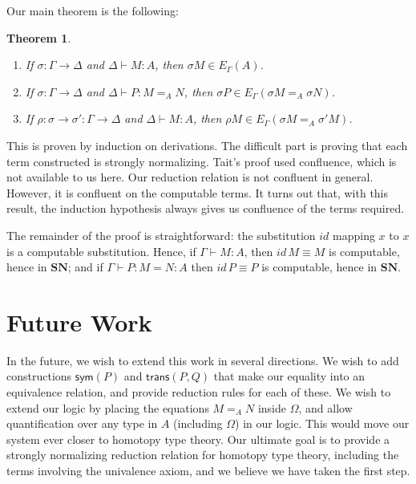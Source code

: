 \documentclass{easychair}
\newcommand{\SN}{\mathbf{SN}}
\newtheorem{theorem}{Theorem}
\begin{document}
Our main theorem is the following:

\begin{theorem}
\begin{enumerate}
\item
If $\sigma : \Gamma \rightarrow \Delta$ and $\Delta \vdash M : A$, then $\sigma M \in E_\Gamma(A)$.
\item
If $\sigma : \Gamma \rightarrow \Delta$ and $\Delta \vdash P : M =_A N$, then $\sigma P \in E_\Gamma(\sigma M =_A \sigma N)$.
\item
If $\rho : \sigma \rightarrow \sigma' : \Gamma \rightarrow \Delta$ and $\Delta \vdash M : A$, then $\rho M \in E_\Gamma(\sigma M =_A \sigma' M)$.
\end{enumerate}
\end{theorem}

This is proven by induction on derivations.  The difficult part is proving that each term constructed is strongly normalizing.  Tait's proof used confluence, which is not available to us here.  Our reduction relation is not confluent in general.  However, it is confluent on the computable terms.  It turns out that, with this result, the induction hypothesis always gives us
confluence of the terms required.

The remainder of the proof is straightforward: the substitution $id$ mapping $x$ to $x$ is a computable substitution.
Hence, if $\Gamma \vdash M : A$, then $id \, M \equiv M$ is computable, hence in $\SN$; and if $\Gamma \vdash P : M = N : A$ then $id \, P \equiv P$ is computable, hence in $\SN$.

\section{Future Work}

In the future, we wish to extend this work in several directions.  We wish to add constructions $\mathsf{sym}(P)$ and $\mathsf{trans}(P,Q)$ that make our equality into an equivalence
relation, and provide reduction rules for each of these.  We wish to extend our logic by placing the equations $M =_A N$ inside $\Omega$, and allow quantification over any type in $A$ (including $\Omega$) in our logic.  This would move our system ever closer to homotopy type theory.  Our ultimate goal is to provide a strongly normalizing reduction relation for homotopy type theory, including the terms involving the univalence axiom, and we believe we have taken the first step.


\end{document}
